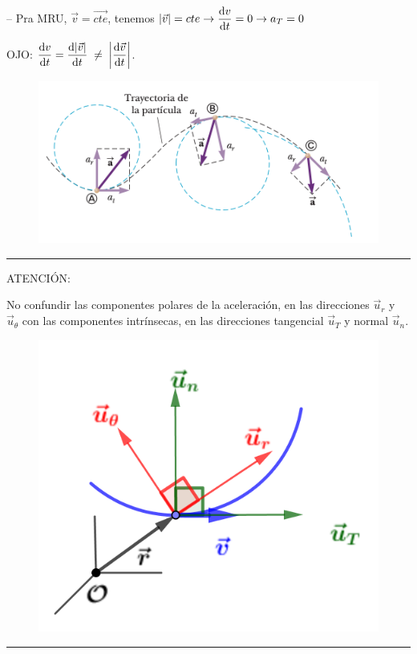-- Pra MRU, $\vec v=\overrightarrow{cte}$, tenemos $\abs{\vec v}=cte \to \displaystyle \dv{v}{t}=0 \to a_T=0$

OJO: $\displaystyle \dv{v}{t}= \dv{\abs{\vec v}}{t} \; \neq \; \abs{\dv{\vec v}{t}}$.

\begin{figure}[H]
		\centering
		\includegraphics[width=.8\textwidth]{imagenes/imagenes02/T02IM39.png}
		\end{figure}
\vspace{-10mm} %
\rule{150pt}{0.4pt}

\begin{multicols}{2}
ATENCIÓN: 

No confundir las componentes polares de la aceleración, en las direcciones $\vec u_r$ y $\vec u_\theta$ con las componentes intrínsecas, en las direcciones tangencial $\vec u_T$ y normal $\vec u_n$.
\begin{figure}[H]
		\centering
		\includegraphics[width=.4\textwidth]{imagenes/imagenes02/T02IM35.png}
		\end{figure}
\end{multicols}
\vspace{-10mm} %
\rule{150pt}{0.4pt}

